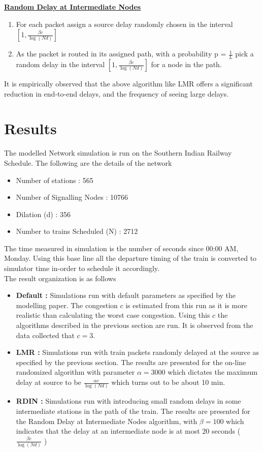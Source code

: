 \documentclass[twoside,11pt]{article}
\begin{document}
\underline{\bf Random Delay at Intermediate Nodes }
\begin{framed}
\begin{enumerate}
\item For each packet assign a source delay randomly chosen in the interval $ [ 1 , \frac{\beta c}{\log(N d)} ] $ 
\item As the packet is routed in its assigned path, with a probability p = $\frac{1}{L}$ pick a random delay in the interval $ [ 1 , \frac{\beta c}{\log(N d)} ] $ for a node in the path.
\end{enumerate}
\end{framed}
It is empirically observed that the above algorithm like LMR offers a significant reduction in end-to-end delays, and the frequency of seeing large delays.

\section{Results}

The modelled Network simulation is run on the Southern Indian Railway Schedule. 
The following are the details of the network
\begin{itemize}
\setlength\itemsep{0.1cm}
\item Number of stations              :  565
\item Number of Signalling Nodes      :  10766
\item Dilation (d)                    :  356
\item Number to trains Scheduled (N) :  2712
\end{itemize}
The time measured in simulation is the number of seconds since 00:00 AM, Monday. Using this base line all the departure timing of the train is converted to simulator time in-order to schedule it accordingly. \\

\noindent The result organization is as follows
\begin{itemize}
 \setlength\itemsep{0.1em}
 \item {\bf Default :} Simulations run with default parameters as specified by the modelling paper. The congestion $c$ is estimated from this run as it is more realistic than calculating the worst case congestion. Using this $c$ the algorithms described in the previous section are run. It is observed from the data collected that $c = 3$.
  \item {\bf LMR : } Simulations run with train packets randomly delayed at the source as specified by the previous section. The results are presented for the on-line  randomized algorithm with parameter $\alpha=3000$ which dictates the maximum delay at source to be $\frac{\alpha c}{\log (Nd) }$  which turns out to be about 10 min.
  \item {\bf RDIN : } Simulations run with introducing small random delays in some intermediate stations in the path of the train. The results are presented for the Random Delay at Intermediate Nodes algorithm, with $\beta=100$ which indicates that the  delay at an intermediate node is at most 20 seconds ( $\frac{\beta c}{\log (Nd) }$ ) 
\end{itemize} 
\end{document}
